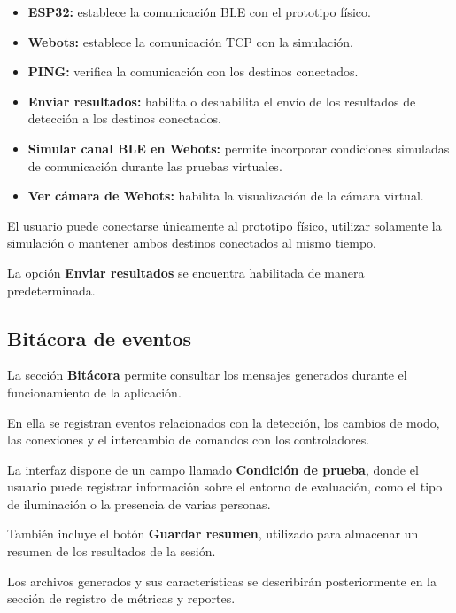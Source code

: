\documentclass[letterpaper,journal]{IEEEtran}
\begin{document}
\begin{itemize}
    \item \textbf{ESP32:} establece la
    comunicación BLE con el prototipo físico.

    \item \textbf{Webots:} establece la
    comunicación TCP con la simulación.

    \item \textbf{PING:} verifica la
    comunicación con los destinos conectados.

    \item \textbf{Enviar resultados:}
    habilita o deshabilita el envío
    de los resultados de detección
    a los destinos conectados.

    \item \textbf{Simular canal BLE en Webots:}
    permite incorporar condiciones
    simuladas de comunicación durante
    las pruebas virtuales.

    \item \textbf{Ver cámara de Webots:}
    habilita la visualización de
    la cámara virtual.
\end{itemize}

El usuario puede conectarse únicamente
al prototipo físico, utilizar solamente
la simulación o mantener ambos destinos
conectados al mismo tiempo.

La opción \textbf{Enviar resultados}
se encuentra habilitada de manera
predeterminada.

\subsection{Bitácora de eventos}

La sección \textbf{Bitácora} permite
consultar los mensajes generados durante
el funcionamiento de la aplicación.

En ella se registran eventos relacionados
con la detección, los cambios de modo,
las conexiones y el intercambio de
comandos con los controladores.

La interfaz dispone de un campo llamado
\textbf{Condición de prueba}, donde el
usuario puede registrar información
sobre el entorno de evaluación, como
el tipo de iluminación o la presencia
de varias personas.

También incluye el botón
\textbf{Guardar resumen}, utilizado
para almacenar un resumen de los
resultados de la sesión.

Los archivos generados y sus
características se describirán
posteriormente en la sección de
registro de métricas y reportes.
\end{document}
